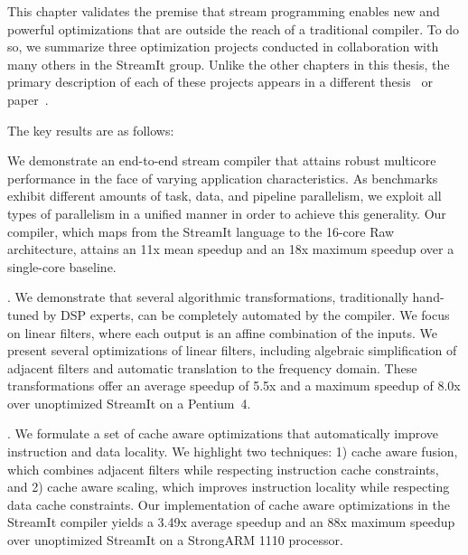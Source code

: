 \label{chap:optimizing}

This chapter validates the premise that stream programming enables new
and powerful optimizations that are outside the reach of a traditional
compiler.  To do so, we summarize three optimization projects
conducted in collaboration with many others in the StreamIt group.
Unlike the other chapters in this thesis, the primary description of
each of these projects appears in a different
thesis~\cite{lamb-thesis,agrawal-thesis,sermulins-thesis} or
paper~\cite{gordon-asplos06}.

The key results are as follows:

\mybegin

  We demonstrate an end-to-end stream 
compiler that attains robust multicore performance in the face of
varying application characteristics.  As benchmarks exhibit different
amounts of task, data, and pipeline parallelism, we exploit all types
of parallelism in a unified manner in order to achieve this
generality.  Our compiler, which maps from the StreamIt language to
the 16-core Raw architecture, attains an 11x mean speedup and an 18x
maximum speedup over a single-core baseline.  

.  We demonstrate that 
several algorithmic transformations, traditionally hand-tuned by DSP
experts, can be completely automated by the compiler.  We focus on
linear filters, where each output is an affine combination of the
inputs.  We present several optimizations of linear filters, including
algebraic simplification of adjacent filters and automatic translation
to the frequency domain.  These transformations offer an average
speedup of 5.5x and a maximum speedup of 8.0x over unoptimized
StreamIt on a Pentium~4.  

.   We formulate a set of cache aware 
optimizations that automatically improve instruction and data
locality.  We highlight two techniques: 1) cache aware fusion, which
combines adjacent filters while respecting instruction cache
constraints, and 2) cache aware scaling, which improves instruction
locality while respecting data cache constraints.  Our implementation
of cache aware optimizations in the StreamIt compiler yields a 3.49x
average speedup and an 88x maximum speedup over unoptimized StreamIt
on a StrongARM 1110 processor.  

